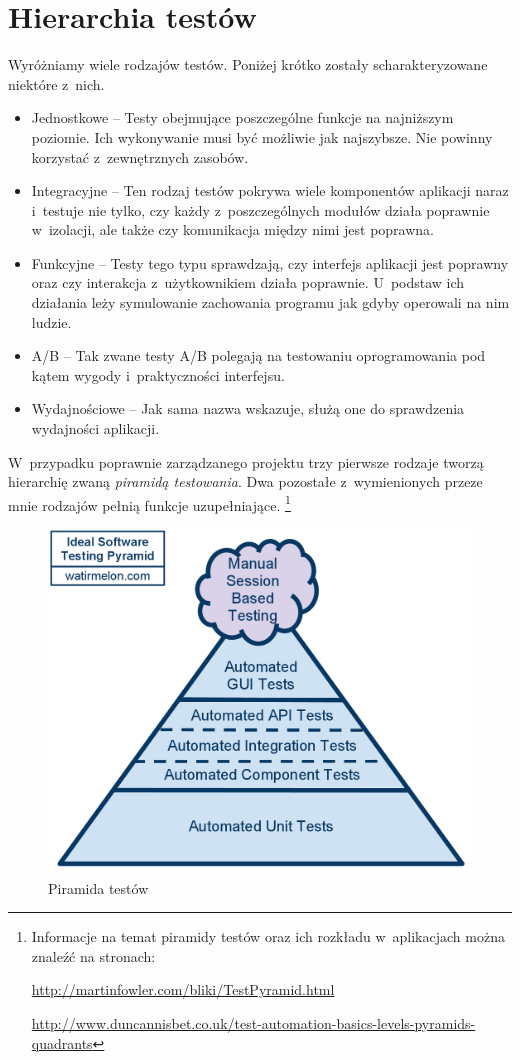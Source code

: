 \documentclass{xmgr}
\begin{document}
\section{Hierarchia testów}

Wyróżniamy wiele rodzajów testów. Poniżej krótko zostały scharakteryzowane niektóre z~nich.
\begin{itemize}
  \item Jednostkowe -- Testy obejmujące poszczególne funkcje na najniższym poziomie. Ich wykonywanie musi być możliwie jak najszybsze. Nie powinny korzystać z~zewnętrznych zasobów.
  \item Integracyjne -- Ten rodzaj testów pokrywa wiele komponentów aplikacji naraz i~testuje nie tylko, czy każdy z~poszczególnych modułów działa poprawnie w~izolacji, ale także czy komunikacja między nimi jest poprawna.
  \item Funkcyjne -- Testy tego typu sprawdzają, czy interfejs aplikacji jest poprawny oraz czy interakcja z~użytkownikiem działa poprawnie. U~podstaw ich działania leży symulowanie zachowania programu jak gdyby operowali na nim ludzie. 
  \item A/B -- Tak zwane testy A/B polegają na testowaniu oprogramowania pod kątem wygody i~praktyczności interfejsu.
  \item Wydajnościowe -- Jak sama nazwa wskazuje, służą one do sprawdzenia wydajności aplikacji.
\end{itemize}

W~przypadku poprawnie zarządzanego projektu trzy pierwsze rodzaje tworzą hierarchię zwaną \textit{piramidą testowania}. Dwa pozostałe z~wymienionych przeze mnie rodzajów pełnią funkcje uzupełniające. 
\footnote{
Informacje na temat piramidy testów oraz ich rozkładu w~aplikacjach można znaleźć na stronach:

\url{http://martinfowler.com/bliki/TestPyramid.html}

\url{http://www.duncannisbet.co.uk/test-automation-basics-levels-pyramids-quadrants}
}

\begin{figure}[h]
    \centering
    \includegraphics[scale=0.25]{idealautomatedtestingpyramid.png}
    \caption{Piramida testów}
    \label{fig:pyramis}
\end{figure}
\end{document}

